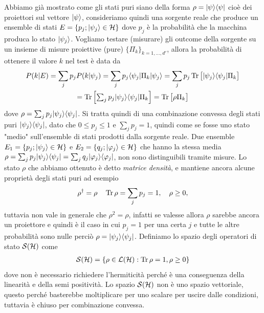 Abbiamo già mostrato come gli stati puri siano della forma $ \rho = \vert \psi \rangle \langle \psi \vert $ cioè dei proiettori sul vettore $ \vert \psi \rangle $, consideriamo 
quindi una sorgente reale che produce un ensemble di stati $ E = \{p_j; \vert \psi_j \rangle \in \operatorname{\mathcal{H}}\} $ dove $ p_j $ è la probabilità che la macchina produca lo 
stato $ \vert \psi_j \rangle $. Vogliamo testare (misurare) gli outcome della sorgente su un insieme di misure proiettive (pure) $ \{\Pi_k\}_{k = 1, \dots, d'} $,
allora la probabilità di ottenere il valore $ k $ nel test è data da 
\begin{gather}
  P(k | E) = \sum_{j} p_j P(k | \psi_j) = \sum_{j} p_j \bk{\psi_j | \Pi_k | \psi_j} = \sum_{j} p_j \Tr\left[ \phb \k{\psi_j}\b{\psi_j} \Pi_k \right] 
  \\
  = \Tr \left[ \textstyle \sum_j p_j \k{\psi_j} \b{\psi_j} \Pi_k \right] = \Tr\left[ \phb \rho \Pi_k \right]
\end{gather}
dove $ \rho = \sum_{j} p_j \vert \psi_j \rangle \langle \psi_j \vert $. Si tratta quindi di una combinazione convessa degli stati puri $ \vert \psi_j \rangle \langle \psi_j \vert $, dato 
che $ 0 \leq p_j \leq 1 $ e $ \sum_j p_j = 1 $, quindi come se fosse uno stato "medio" sull'ensemble di stati prodotti dalla sorgente reale. Due ensemble 
$ E_1 = \{p_j; \vert \psi_j \rangle \in \operatorname{\mathcal{H}}\} $ e $ E_2 = \{q_j; \k{\varphi_j} \in \H\} $ che hanno la stessa media 
$ \rho = \sum_{j} p_j \k{\psi_j} \b{\psi_j} = \sum_{j} q_j \k{\varphi_j} \b{\varphi_j} $, non sono distinguibili tramite misure. Lo stato $ \rho $ che 
abbiamo ottenuto è detto \textit{matrice densità}, e mantiene ancora alcune proprietà degli stati puri ad esempio 
\begin{align*}
  \rho^\dag = \rho \quad \operatorname{\textnormal{Tr}} \rho = \sum_j p_j = 1, \quad \rho \geq 0,
\end{align*}
tuttavia non vale in generale che $ \rho^2 = \rho $, infatti se valesse allora $ \rho $ sarebbe ancora un proiettore e quindi è il caso in cui 
$ p_j = 1 $ per una certa $ j $ e tutte le altre probabilità sono nulle perciò $ \rho = \vert \psi_j \rangle \langle \psi_j \vert $. Definiamo lo spazio degli operatori di 
stato $ \mathcal{S}(\operatorname{\mathcal{H}}) $ come 
\begin{align*}
  \mathcal{S}(\operatorname{\mathcal{H}}) = \left\{ \rho \in \operatorname{\mathcal{L}}(\operatorname{\mathcal{H}}) : \operatorname{\textnormal{Tr}} \rho = 1, \rho \geq 0 \right\}
\end{align*}
dove non è necessario richiedere l'hermiticità perché è una conseguenza della linearità e della semi positività. Lo spazio $ \mathcal{S}(\operatorname{\mathcal{H}}) $ non è uno spazio 
vettoriale, questo perché basterebbe moltiplicare per uno scalare per uscire dalle condizioni, tuttavia è chiuso per combinazione convessa.

